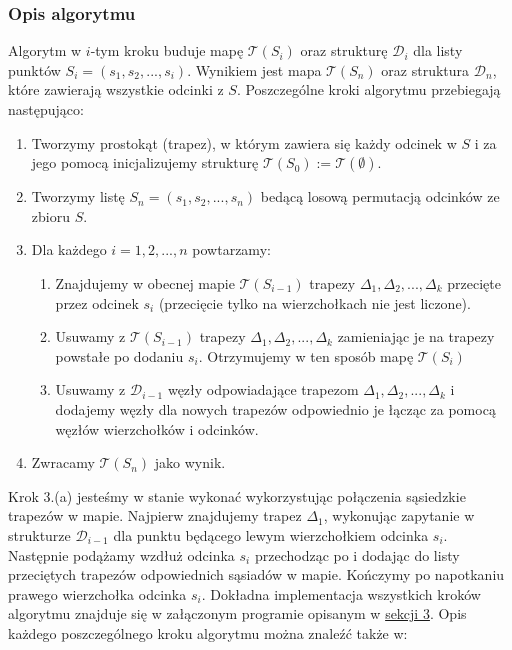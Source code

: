 \documentclass[11pt,a4paper]{article}
\begin{document}
\subsubsection{Opis algorytmu}
Algorytm w $i$-tym kroku buduje mapę $\mathscr{T}(S_i)$
oraz strukturę $\mathscr{D}_i$ dla listy punktów 
$S_i = (s_1, s_2, ..., s_i)$. Wynikiem jest mapa 
$\mathscr{T}(S_n)$ oraz struktura $\mathscr{D}_n$,
które zawierają wszystkie odcinki z $S$.
Poszczególne kroki algorytmu przebiegają następująco:
\begin{enumerate}
    \item Tworzymy prostokąt (trapez), w którym zawiera się
    każdy odcinek w $S$ i za jego pomocą inicjalizujemy
    strukturę $\mathscr{T}(S_0) := \mathscr{T}(\emptyset)$.
    \item Tworzymy listę $S_n = (s_1, s_2, ..., s_n)$ bedącą
    losową permutacją odcinków ze zbioru $S$.
    \item Dla każdego $i = 1, 2, ..., n$ powtarzamy:
    \begin{enumerate}
        \item Znajdujemy w obecnej mapie $\mathscr{T}(S_{i - 1})$
        trapezy $\Delta_1, \Delta_2, ..., \Delta_k$ przecięte
        przez odcinek $s_i$ (przecięcie tylko na wierzchołkach
        nie jest liczone).
        \item Usuwamy z $\mathscr{T}(S_{i - 1})$ trapezy
        $\Delta_1, \Delta_2, ..., \Delta_k$ zamieniając je
        na trapezy powstałe po dodaniu $s_i$. Otrzymujemy
        w ten sposób mapę $\mathscr{T}(S_i)$
        \item Usuwamy z $\mathscr{D}_{i - 1}$ węzły odpowiadające
        trapezom $\Delta_1, \Delta_2, ..., \Delta_k$
        i dodajemy węzły dla nowych trapezów odpowiednio
        je łącząc za pomocą węzłów wierzchołków i odcinków.
    \end{enumerate}
    \item Zwracamy $\mathscr{T}(S_n)$ jako wynik.
\end{enumerate}

Krok 3.(a) jesteśmy w stanie wykonać wykorzystując 
połączenia sąsiedzkie trapezów w mapie. Najpierw znajdujemy
trapez $\Delta_1$, wykonując zapytanie w strukturze $\mathscr{D}_{i - 1}$
dla punktu będącego lewym wierzchołkiem odcinka $s_i$.
Następnie podążamy wzdłuż odcinka $s_i$ przechodząc po i dodając do
listy przeciętych trapezów odpowiednich sąsiadów w mapie. Kończymy
po napotkaniu prawego wierzchołka odcinka $s_i$.
Dokładna implementacja wszystkich kroków algorytmu
znajduje się w załączonym programie opisanym 
w \hyperlink{section.3}{sekcji 3}. Opis każdego 
poszczególnego kroku algorytmu można znaleźć także
w: \cite[s. 129-133]{compgeo}
\end{document}
